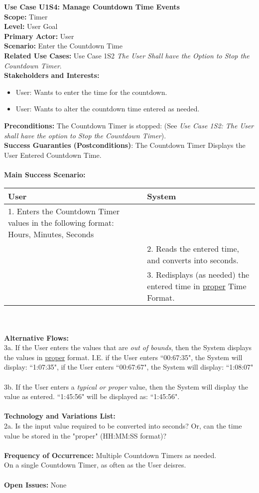 \documentclass[letterpaper]{article}
\begin{document}
\noindent
\textbf{Use Case U1S4:  Manage Countdown Time Events}\\
\textbf{Scope:  }Timer\\
\textbf{Level:  }User Goal\\
\textbf{Primary Actor:  }User\\
\textbf{Scenario:  }Enter the Countdown Time\\
\textbf{Related Use Cases:  }Use Case 1S2 \textit{The User Shall have
the Option to Stop the Countdown Timer}.\\
\textbf{Stakeholders and Interests:}
\begin{itemize}
\item User:  Wants to enter the time for the countdown.
\item User:  Wants to alter the countdown time entered as needed.
\end{itemize}
\textbf{Preconditions:  }The Countdown Timer is stopped:  (See
\textit{Use Case 1S2: The User shall have the option to Stop the
Countdown Timer}).\\
\textbf{Success Guaranties  (Postconditions)}: 
The Countdown Timer Displays the User Entered Countdown Time.\\\\
\textbf{Main Success Scenario: }\\
\begin{tabular}{|p{6cm}|p{6cm}|}\hline
\textbf{User} & \textbf{System}\\\hline
1.  Enters the Countdown Timer values in the following format:
Hours, Minutes, Seconds & \\\hline
&2.  Reads the entered time, and converts into seconds.\\\hline
&3.  Redisplays (as needed)  the entered time in \underline{proper}
Time Format.\\\hline
\end{tabular}\\\\
\textbf{Alternative Flows:  }\\
3a.  If the User enters the values that are \textit{out of bounds},
then the System displays the values in \underline{proper} format. I.E.
if the User enters ``00:67:35", the System will display:  ``1:07:35",
if the User enters ``00:67:67", the System will display: ``1:08:07"\\\\
3b.  If the User enters a \textit{typical or proper} value, then the
System will display the value as entered. ``1:45:56" will be displayed
as:  ``1:45:56".\\\\
\textbf{Technology and Variations List:  }\\
2a.  Is the input value required to be converted into seconds? Or, can the
time value be stored in the "proper" (HH:MM:SS format)?\\\\
\textbf{Frequency of Occurrence:  }Multiple Countdown Timers as
needed.\\
On a single Countdown Timer, as often as the User deisres.\\\\
\textbf{Open Issues:  }
None
\end{document}
